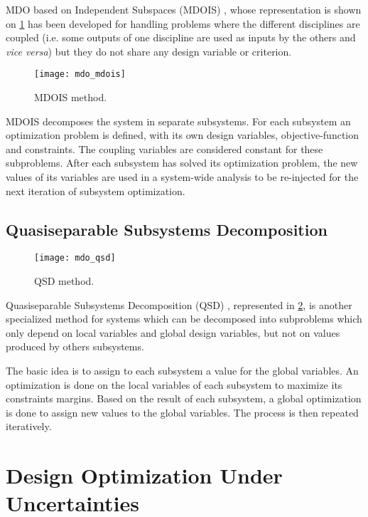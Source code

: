 MDO based on Independent Subspaces (MDOIS) \cite{NME:NME1380}, whose representation is shown on \figurename{} \ref{mdois_graph} has been developed for handling problems where the different disciplines are coupled (i.e. some outputs of one discipline are used as inputs by the others and \emph{vice versa}) but they do not share any design variable or criterion.

\begin{figure}
\centering
\texttt{[image: mdo\_mdois]}
\caption{MDOIS method.}\label{mdois_graph}
\end{figure}

MDOIS decomposes the system in separate subsystems. For each subsystem an optimization problem is defined, with its own design variables, objective-function and constraints. The coupling variables are considered constant for these subproblems. After each subsystem has solved its optimization problem, the new values of its variables are used in a system-wide analysis to be re-injected for the next iteration of subsystem optimization.

\subsection{Quasiseparable Subsystems Decomposition}

\begin{figure}
\centering
\texttt{[image: mdo\_qsd]}
\caption{QSD method.}\label{qsd_graph}
\end{figure}

Quasiseparable Subsystems Decomposition (QSD) \cite{1389-4420}, represented in \figurename{} \ref{qsd_graph}, is another specialized method for systems which can be decomposed into subproblems which only depend on local variables and global design variables, but not on values produced by others subsystems.

The basic idea is to assign to each subsystem a value for the global variables. An optimization is done on the local variables of each subsystem to maximize its constraints margins. Based on the result of each subsystem, a global optimization is done to assign new values to the global variables. The process is then repeated iteratively.

\section{Design Optimization Under Uncertainties}\label{SOA_uncertainties}

